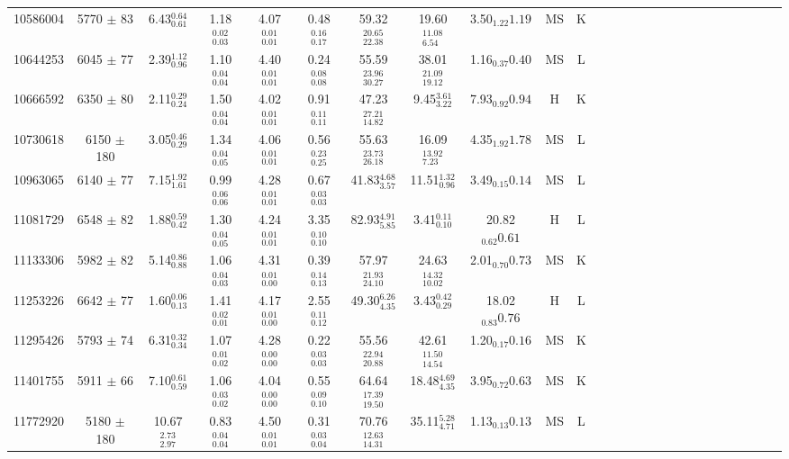 \begin{table}
\begin{tabular}{cccccccccccccccccccccccccc}
10586004 & 5770 $\pm$ 83 & 6.43$_{0.61}^{0.64}$ & 1.18$_{0.03}^{0.02}$ & 4.07$_{0.01}^{0.01}$ & 0.48$_{0.17}^{0.16}$ & 59.32$_{22.38}^{20.65}$ & 19.60$_{6.54}^{11.08}$ & 3.50$_{1.22}{1.19}$ & MS & K \\
10644253 & 6045 $\pm$ 77 & 2.39$_{0.96}^{1.12}$ & 1.10$_{0.04}^{0.04}$ & 4.40$_{0.01}^{0.01}$ & 0.24$_{0.08}^{0.08}$ & 55.59$_{30.27}^{23.96}$ & 38.01$_{19.12}^{21.09}$ & 1.16$_{0.37}{0.40}$ & MS & L \\
10666592 & 6350 $\pm$ 80 & 2.11$_{0.24}^{0.29}$ & 1.50$_{0.04}^{0.04}$ & 4.02$_{0.01}^{0.01}$ & 0.91$_{0.11}^{0.11}$ & 47.23$_{14.82}^{27.21}$ & 9.45$_{3.22}^{3.61}$ & 7.93$_{0.92}{0.94}$ & H & K \\
10730618 & 6150 $\pm$ 180 & 3.05$_{0.29}^{0.46}$ & 1.34$_{0.05}^{0.04}$ & 4.06$_{0.01}^{0.01}$ & 0.56$_{0.25}^{0.23}$ & 55.63$_{26.18}^{23.73}$ & 16.09$_{7.23}^{13.92}$ & 4.35$_{1.92}{1.78}$ & MS & L \\
10963065 & 6140 $\pm$ 77 & 7.15$_{1.61}^{1.92}$ & 0.99$_{0.06}^{0.06}$ & 4.28$_{0.01}^{0.01}$ & 0.67$_{0.03}^{0.03}$ & 41.83$_{3.57}^{4.68}$ & 11.51$_{0.96}^{1.32}$ & 3.49$_{0.15}{0.14}$ & MS & L \\
11081729 & 6548 $\pm$ 82 & 1.88$_{0.42}^{0.59}$ & 1.30$_{0.05}^{0.04}$ & 4.24$_{0.01}^{0.01}$ & 3.35$_{0.10}^{0.10}$ & 82.93$_{5.85}^{4.91}$ & 3.41$_{0.10}^{0.11}$ & 20.82$_{0.62}{0.61}$ & H & L \\
11133306 & 5982 $\pm$ 82 & 5.14$_{0.88}^{0.86}$ & 1.06$_{0.03}^{0.04}$ & 4.31$_{0.00}^{0.01}$ & 0.39$_{0.13}^{0.14}$ & 57.97$_{24.10}^{21.93}$ & 24.63$_{10.02}^{14.32}$ & 2.01$_{0.70}{0.73}$ & MS & K \\
11253226 & 6642 $\pm$ 77 & 1.60$_{0.13}^{0.06}$ & 1.41$_{0.01}^{0.02}$ & 4.17$_{0.00}^{0.01}$ & 2.55$_{0.12}^{0.11}$ & 49.30$_{4.35}^{6.26}$ & 3.43$_{0.29}^{0.42}$ & 18.02$_{0.83}{0.76}$ & H & L \\
11295426 & 5793 $\pm$ 74 & 6.31$_{0.34}^{0.32}$ & 1.07$_{0.02}^{0.01}$ & 4.28$_{0.00}^{0.00}$ & 0.22$_{0.03}^{0.03}$ & 55.56$_{20.88}^{22.94}$ & 42.61$_{14.54}^{11.50}$ & 1.20$_{0.17}{0.16}$ & MS & K \\
11401755 & 5911 $\pm$ 66 & 7.10$_{0.59}^{0.61}$ & 1.06$_{0.02}^{0.03}$ & 4.04$_{0.00}^{0.00}$ & 0.55$_{0.10}^{0.09}$ & 64.64$_{19.50}^{17.39}$ & 18.48$_{4.35}^{4.69}$ & 3.95$_{0.72}{0.63}$ & MS & K \\
11772920 & 5180 $\pm$ 180 & 10.67$_{2.97}^{2.73}$ & 0.83$_{0.04}^{0.04}$ & 4.50$_{0.01}^{0.01}$ & 0.31$_{0.04}^{0.03}$ & 70.76$_{14.31}^{12.63}$ & 35.11$_{4.71}^{5.28}$ & 1.13$_{0.13}{0.13}$ & MS & L \\

\end{tabular}
\end{table}
